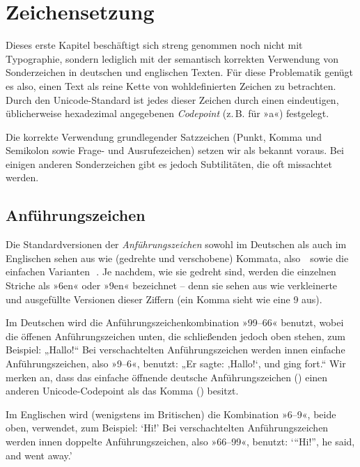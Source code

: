 \chapter{Zeichensetzung}

Dieses erste Kapitel beschäftigt sich streng genommen noch nicht mit
Typographie, sondern lediglich mit der semantisch korrekten Verwendung von
Sonderzeichen in deutschen und englischen Texten. Für diese Problematik genügt
es also, einen Text als reine Kette von wohldefinierten Zeichen zu betrachten.
Durch den Unicode-Standard ist jedes dieser Zeichen durch einen
eindeutigen, üblicherweise hexadezimal angegebenen \emph{Codepoint} (z.\,B.  für »a«) festgelegt.

Die korrekte Verwendung grundlegender Satzzeichen (Punkt, Komma und Semikolon sowie
Frage- und Ausrufezeichen) setzen wir als bekannt voraus. Bei einigen
anderen Sonderzeichen gibt es jedoch Subtilitäten, die oft missachtet werden.

\section{Anführungszeichen}

Die Standardversionen der \emph{Anführungszeichen} sowohl im Deutschen als auch
im Englischen sehen aus wie (gedrehte und verschobene) Kommata, also
\,\, sowie die einfachen Varianten
\,\,.  Je nachdem, wie sie gedreht sind, werden die
einzelnen Striche als »6en« oder »9en« bezeichnet -- denn sie sehen
aus wie verkleinerte und ausgefüllte Versionen dieser Ziffern (ein Komma
\Char{,} sieht wie eine 9 aus).

Im Deutschen wird die Anführungszeichenkombination »99–66« benutzt, wobei die
öffenen Anführungszeichen unten, die schließenden jedoch oben stehen, zum
Beispiel: „Hallo!“ Bei verschachtelten Anführungszeichen werden innen einfache
Anführungszeichen, also »9–6«, benutzt: „Er sagte: ‚Hallo!{‘}, und ging fort.“
Wir merken an, dass das einfache öffnende deutsche Anführungszeichen 
() einen anderen Unicode-Codepoint als das Komma \Char{,}
() besitzt.

Im Englischen wird (wenigstens im Britischen) die Kombination »6–9«,
beide oben, verwendet, zum Beispiel: \foreignlanguage{british}{‘Hi!’}
Bei verschachtelten Anführungszeichen werden innen doppelte
Anführungszeichen, also »66–99«, benutzt:
\foreignlanguage{british}{‘“Hi!”, he said, and went away.’}

